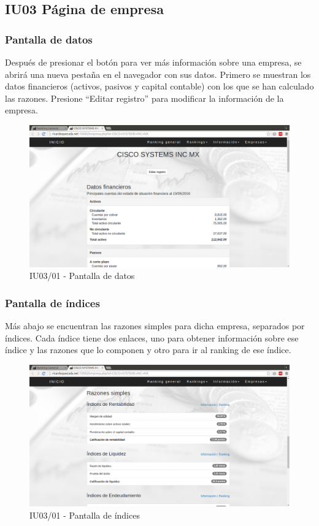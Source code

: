 \hypertarget{IU03}{\subsection{IU03 Página de empresa}}


    \subsubsection{Pantalla de datos}

    Después de presionar el botón para ver más información sobre una empresa,
    se abrirá una nueva pestaña en el navegador con sus datos.
    Primero se muestran los datos financieros (activos, pasivos y capital contable)
    con los que se han calculado las razones. Presione ``Editar registro''
    para modificar la información de la empresa.

    \begin{figure}[H]
        \begin{center}
            \includegraphics[scale=0.3]{pantallas/Empresa1}
            \caption{IU03/01 - Pantalla de datos}
        \end{center}
    \end{figure}


    \subsubsection{Pantalla de índices}

    Más abajo se encuentran las razones simples para dicha empresa,
    separados por índices. Cada índice tiene dos enlaces,
    uno para obtener información sobre ese índice y las razones que lo componen 
    y otro para ir al ranking de ese índice.

    \begin{figure}[H]
        \begin{center}
            \includegraphics[scale=0.3]{pantallas/Empresa2}
            \caption{IU03/01 - Pantalla de índices}
        \end{center}
    \end{figure}
